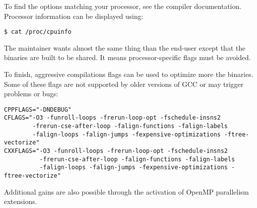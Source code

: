To find the options matching your processor, see the compiler
documentation. Processor information can be displayed using:
\begin{verbatim}
$ cat /proc/cpuinfo
\end{verbatim}


The maintainer wants almost the same thing than the end-user except
that the binaries are built to be shared. It means processor-specific
flags must be avoided.


To finish, aggressive compilations flags can be used to optimize more
the binaries. Some of these flags are not supported by older versions
of GCC or may trigger problems or bugs:

\begin{verbatim}
CPPFLAGS="-DNDEBUG"
CFLAGS="-O3 -funroll-loops -frerun-loop-opt -fschedule-insns2
        -frerun-cse-after-loop -falign-functions -falign-labels
        -falign-loops -falign-jumps -fexpensive-optimizations -ftree-vectorize"
CXXFLAGS="-O3 -funroll-loops -frerun-loop-opt -fschedule-insns2
          -frerun-cse-after-loop -falign-functions -falign-labels
          -falign-loops -falign-jumps -fexpensive-optimizations -ftree-vectorize"
\end{verbatim}

Additional gains are also possible through the activation of OpenMP
parallelism extensions.
